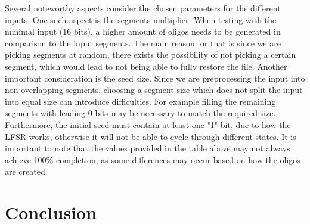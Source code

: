 \documentclass[12pt]%
{article}
\begin{document}
Several noteworthy aspects consider the chosen parameters for the different inputs. One such aspect is the segments multiplier. When testing with the minimal input (16 bits), a higher amount of oligos needs to be generated in comparison to the input segments. The main reason for that is since we are picking segments at random, there exists the possibility of not picking a certain segment, which would lead to not being able to fully restore the file. Another important consideration is the seed size. Since we are preprocessing the input into non-overlapping segments, choosing a segment size which does not split the input into equal size can introduce difficulties. For example filling the remaining segments with leading 0 bits may be necessary to match the required size. Furthermore, the initial seed must contain at least one "1" bit, due to how the LFSR works, otherwise it will not be able to cycle through different states. It is important to note that the values provided in the table above may not always achieve 100\% completion, as some differences may occur based on how the oligos are created. 


\newpage
\newpage
\section{Conclusion}
\end{document}
